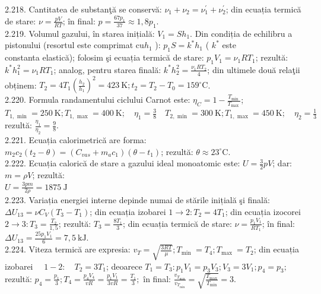 2.218. Cantitatea de substanţă se conservă: $\nu_{1}+\nu_{2}=\nu_{1}^{\prime}+\nu_{2}^{\prime}$; din ecuația termică de stare: $\nu=\frac{p V}{R T}$; în final: $p=\frac{67 p_{1}}{37} \approx 1,8 p_{1}$.\\

2.219. Volumul gazului, în starea inițială: $V_{1}=S h_{1}$. Din condiția de echilibru a pistonului (resortul este comprimat $\mathrm{cu} h_{1}$ ): $p_{1} S=k^{*} h_{1}$ ( $k^{*}$ este\\ constanta elastică); folosim şi ecuația termică de stare: $p_{1} V_{1}=\nu_{1} R T_{1}$; rezultă: $k^{*} h_{1}^{2}=\nu_{1} R T_{1}$; analog, pentru starea finală: $k^{*} h_{2}^{2}=\frac{\nu_{1} R T_{2}}{4}$; din ultimele două relaţii obținem: $T_{2}=4 T_{1}\left(\frac{h_{2}}{h_{1}}\right)^{2}=423 \mathrm{~K} ; t_{2}=T_{2}-T_{0}=159^{\circ} \mathrm{C}$.\\

2.220. Formula randamentului ciclului Carnot este: $\eta_{C}=1-\frac{T_{\text {min }}}{T_{\text {max }}}$; $T_{1, \text { min }}=250 \mathrm{~K} ; T_{1, \text { max }}=400 \mathrm{~K} ; \quad \eta_{1}=\frac{3}{8} \quad T_{2, \text { min }}=300 \mathrm{~K} ; T_{1, \text { max }}=450 \mathrm{~K} ; \quad \eta_{2}=\frac{1}{3}$ rezultă: $\frac{\eta_{1}}{\eta_{2}}=\frac{9}{8}$.\\

2.221. Ecuația calorimetrică are forma: $m_{2} c_{2}\left(t_{2}-\theta\right)=\left(C_{v a s}+m_{a} c_{1}\right)\left(\theta-t_{1}\right)$; rezultă: $\theta \approx 23^{\circ} \mathrm{C}$.\\

2.222. Ecuația calorică de stare a gazului ideal monoatomic este: $U=\frac{3}{2} p V$; dar: $m=\rho V$; rezultă:\\ $U=\frac{3 p m}{2 \rho}=1875 \mathrm{~J}$\\

2.223. Variația energiei interne depinde numai de stările inițială şi finală: $\Delta U_{13}=\nu C_{V}\left(T_{3}-T_{1}\right)$; din ecuația izobarei $1 \rightarrow 2: T_{2}=4 T_{1}$; din ecuația izocorei $2 \rightarrow 3: T_{3}=\frac{T_{2}}{1,5}$; rezultă: $T_{3}=\frac{8 T_{1}}{3}$; din ecuația termică de stare: $\nu=\frac{p_{1} V_{1}}{R T_{1}}$; în final:\\ $\Delta U_{13}=\frac{25 p_{1} V_{1}}{6}=7,5 \mathrm{~kJ}$.\\

2.224. Viteza termică are expresia: $v_{T}=\sqrt{\frac{3 R T}{\mu}} ; T_{\text {min }}=T_{4} ; T_{\text {max }}=T_{2}$; din ecuația izobarei $\quad 1-2: \quad T_{2}=3 T_{1}$; deoarece $T_{1}=T_{3}: p_{1} V_{1}=p_{3} V_{3} ; V_{3}=3 V_{1} ; p_{4}=p_{3} ;$ rezultă: $p_{4}=\frac{p_{1}}{3} ; T_{4}=\frac{p_{4} V_{4}}{v R}=\frac{p_{1} V_{1}}{3 v R}=\frac{T_{1}}{3} ;$ în final: $\frac{v_{T_{\max }}}{v_{T_{\min }}}=\sqrt{\frac{T_{\max }}{T_{\min }}}=3$.\\

